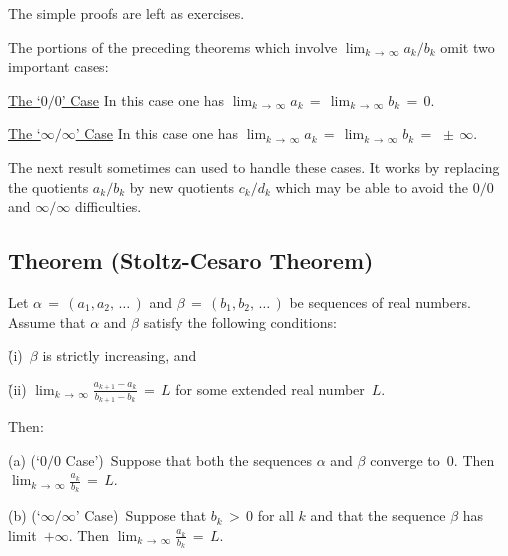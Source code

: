 \V

        The simple proofs are left as exercises. %

\VV

        The portions of the preceding theorems which involve $\lim_{k \,{\rightarrow}\, {\infty}} a_{k}/b_{k}$ omit two important cases:

        \h \underline{The `$0/0$' Case} In this case one has $\lim_{k \,{\rightarrow}\, {\infty}} a_{k} \,=\, \lim_{k \,{\rightarrow}\, {\infty}} b_{k} \,=\, 0$.

        \h \underline{The `${\infty}/{\infty}$' Case} In this case one has $\lim_{k \,{\rightarrow}\, {\infty}} a_{k} \,=\, \lim_{k \,{\rightarrow}\, {\infty}} b_{k} \,=\,  \,{\pm}\, {\infty}$.

\noindent The next result sometimes can used to handle these cases. It works by replacing the quotients
    $a_{k}/b_{k}$ by new quotients $c_{k}/d_{k}$ which may be able to avoid the $0/0$ and ${\infty}/{\infty}$ difficulties.

\V

            \subsection{\small{\bf Theorem} (Stoltz-Cesaro Theorem)}
            \label{ThmC60.55A}

\V

       Let ${\alpha} \,=\, (a_{1},a_{2},\,{\ldots}\,)$ and ${\beta} \,=\, (b_{1},b_{2},\,{\ldots}\,)$ be sequences of real numbers.
    Assume that ${\alpha}$ and ${\beta}$ satisfy the following conditions:

\VA

        \h (i)\, ${\beta}$ is strictly increasing, and

        \h (ii) ${\displaystyle \lim_{k \,{\rightarrow}\, {\infty}} \frac{a_{k+1} - a_{k}}{b_{k+1} - b_{k}} \,=\, L}$ for some extended real number~$L$.

\VA

\noindent Then:

\V

        (a) (`$0/0$ Case')\, Suppose that both the sequences ${\alpha}$ and ${\beta}$ converge to~$0$.
    Then ${\displaystyle \lim_{k \,{\rightarrow}\, {\infty}} \frac{a_{k}}{b_{k}} \,=\, L}$.


\V

        (b) (`${\infty}/{\infty}$' Case)\, Suppose that $b_{k}\,>\,0$ for all $k$ and that the sequence ${\beta}$ has limit~$+{\infty}$.
    Then ${\displaystyle \lim_{k \,{\rightarrow}\, {\infty}} \frac{a_{k}}{b_{k}} \,=\, L}$.


